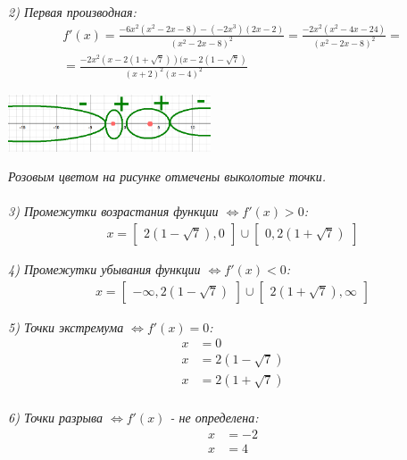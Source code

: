 \documentclass[a4paper,11pt]{article}
\begin{document}
\noindent  \textsl{2) Первая производная:}
\begin{gather*}
f'(x) = \frac{-6x^2(x^2 - 2x - 8) - (-2x^3)(2x - 2)}{(x^2 - 2x - 8)^2} = \frac{-2x^2(x^2 - 4x - 24)}{(x^2 - 2x - 8)^2} = \\
=  \frac{-2x^2(x - 2(1 + \sqrt{7}))(x - 2(1 - \sqrt{7})}{(x + 2)^2(x - 4)^2}
\end{gather*} 
\begin{center}
	\includegraphics[width = 60mm]{images/722.png}
\end{center}
\noindent \textit{Розовым цветом на рисунке отмечены выколотые точки.} \\ \\

\noindent \textsl{3) Промежутки возрастания функции   $\Longleftrightarrow f'(x) > 0 $:}
\begin{gather*}
x = \begin{bmatrix}2(1 - \sqrt{7}), 0\end{bmatrix} \cup \begin{bmatrix}0, 2(1 + \sqrt{7})\end{bmatrix}
\end{gather*}

\noindent \textsl{4) Промежутки убывания функции   $\Longleftrightarrow f'(x) < 0 $:}
\begin{gather*}
x = \begin{bmatrix}-\infty, 2(1 - \sqrt{7})\end{bmatrix} \cup \begin{bmatrix}
2(1 + \sqrt{7}), \infty\end{bmatrix}
\end{gather*}

\noindent \textsl{5) Точки экстремума   $\Longleftrightarrow f'(x) = 0 $:}
\begin{align*}
 x &= 0 \\
 x &= 2(1 - \sqrt{7}) \\
 x &= 2(1 + \sqrt{7}) \\
\end{align*}

\noindent \textsl{6) Точки разрыва $ \Longleftrightarrow f'(x) $  - не определена:}
\begin{align*}
x &= -2 \\
x &= 4
\end{align*}
\end{document}
